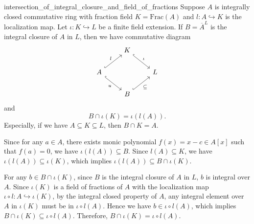 \begin{proposition}{}{intersection_of_integral_closure_and_field_of_fractions}
    Suppose $A$ is integrally closed commutative ring with fraction field $K=\mathrm{Frac}(A)$ and $l:A\hookrightarrow K$ is the localization map. Let $\iota: K\hookrightarrow L$ be a finite field extension. If $B=\overline{A}^L$ is the integral closure of $A$ in $L$, then we have commutative diagram
    \[
        \begin{tikzcd}
                & K \arrow[rd, "\iota", hook]      &   \\
    A \arrow[ru, "l", hook] \arrow[rd, "u"', hook] &                                  & L \\
                & B \arrow[ru, "\subseteq"', hook] &  
        \end{tikzcd}
    \]
    and
    \[
    B\cap \iota(K)=\iota(l(A)).
    \]
    Especially, if we have $A\subseteq K\subseteq L$, then $B\cap K=A$.
\end{proposition}
\begin{prf}
    Since for any $a\in A$, there exists monic polynomial $f(x)=x-c\in A[x]$ such that $f(a)=0$, we have $\iota(l(A))\subseteq B$. Since $l(A)\subseteq K$, we have $\iota(l(A))\subseteq \iota(K)$, which implies $\iota(l(A)) \subseteq B\cap \iota(K)$. 

    For any $b\in B\cap \iota(K)$, since $B$ is the integral closure of $A$ in $L$, $b$ is integral over $A$. Since $\iota(K)$ is a field of fractions of $A$ with the localization map $\iota\circ l: A\hookrightarrow \iota(K)$, by the integral closed property of $A$, any integral element over $A$ in $\iota(K)$ must be in $\iota\circ l(A)$. Hence we have $b\in \iota\circ l(A)$, which implies $B\cap \iota(K)\subseteq \iota\circ l(A)$. Therefore, $B\cap \iota(K)=\iota\circ l(A)$.
\end{prf}

